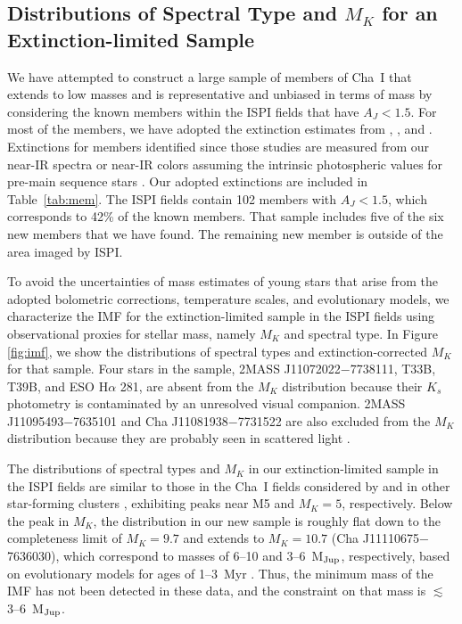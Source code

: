 \documentclass{emulateapj}
\begin{document}
\subsection{Distributions of Spectral Type and $M_K$ for an Extinction-limited Sample}
\label{sec:imf}

We have attempted to construct a large sample of members of Cha~I that extends
to low masses and is representative and unbiased in terms of mass by 
considering the known members within the ISPI fields that have $A_J<1.5$.
For most of the members, we have adopted the extinction estimates 
from \cite{luhm07}, \cite{luh08}, and \cite{luhM08}.
Extinctions for members identified since those studies
are measured from our near-IR spectra 
or near-IR colors assuming the intrinsic photospheric values for pre-main sequence stars \citep{luh10}.
Our adopted extinctions are included in Table~\ref{tab:mem}.
The ISPI fields contain 102 members with $A_J<1.5$, 
which corresponds to 42\% of the known members. That sample includes five of
the six new members that we have found. The remaining new member
is outside of the area imaged by ISPI.

To avoid the uncertainties of mass estimates of young stars that arise from the adopted bolometric corrections,
temperature scales, and evolutionary models,
we characterize the IMF for the extinction-limited sample in the ISPI fields 
using observational proxies for stellar mass, 
namely $M_K$ and spectral type.
In Figure \ref{fig:imf}, 
we show the distributions of spectral types and extinction-corrected $M_K$ for that sample.
Four stars in the sample, 
2MASS J11072022$-$7738111, T33B, T39B, and ESO H$\alpha$ 281, 
are absent from the $M_K$ distribution 
because their $K_s$ photometry is contaminated by an unresolved visual companion. 
2MASS J11095493$-$7635101 and Cha J11081938$-$7731522 are also excluded
from the $M_K$ distribution because they are probably seen in scattered light \citep{luhm07,luh08}.

The distributions of spectral types and $M_K$ in our 
extinction-limited sample in the ISPI fields are similar to
those in the Cha~I fields considered by \cite{luhm07} and in other star-forming clusters \citep{luh16},
exhibiting peaks near M5 and $M_K=5$, respectively. 
Below the peak in $M_K$, the distribution in our new sample is roughly flat down to the completeness
limit of $M_K=9.7$ and extends to $M_K=10.7$ (Cha J11110675$-$7636030), which correspond to masses of
6--10 and 3--6~M$_{\rm Jup}$, respectively, based on evolutionary models for ages of 1--3~Myr
\citep{bur97,cha00,bar15}. 
Thus, the minimum mass of the IMF has not been detected in
these data, and the constraint on that mass is $\lesssim$3--6~M$_{\rm Jup}$.
\end{document}
